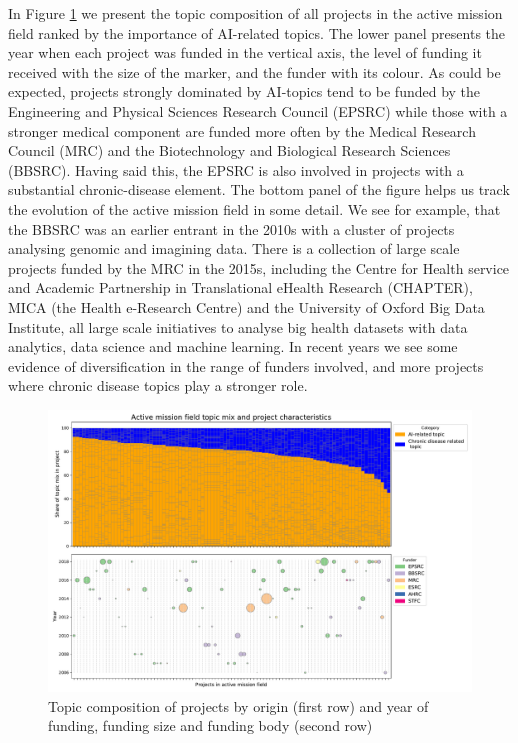 \documentclass[11pt]{article}
\begin{document}
In Figure \ref{fig:topic_comp} we present the topic composition of all projects in the active mission field ranked by the importance of AI-related topics. The lower panel presents the year when each project was funded in the vertical axis, the level of funding it received with the size of the marker, and the funder with its colour. As could be expected, projects strongly dominated by AI-topics tend to be funded by the Engineering and Physical Sciences Research Council (EPSRC) while those with a stronger medical component are funded more often by the Medical Research Council (MRC) and the Biotechnology and Biological Research Sciences (BBSRC). Having said this, the EPSRC is also involved in projects with a substantial chronic-disease element. 
The bottom panel of the figure helps us track the evolution of the active mission field in some detail. We see for example, that the BBSRC was an earlier entrant in the 2010s with a cluster of projects analysing genomic and imagining data. There is a collection of large scale projects funded by the MRC in the 2015s, including the Centre for Health service and Academic Partnership in Translational eHealth Research (CHAPTER), MICA (the Health e-Research Centre) and the University of Oxford Big Data Institute, all large scale initiatives to analyse big health datasets with data analytics, data science and machine learning. In recent years we see some evidence of diversification in the range of funders involved, and more projects where chronic disease topics play a stronger role.

\begin{figure}[!ht]
    \centering
    \includegraphics[width=\textwidth]{figures/fig_19_proj_distr.pdf}
    \caption{Topic composition of projects by origin (first row) and year of funding, funding size and funding body (second row)}
    \label{fig:topic_comp}
\end{figure}
\end{document}

